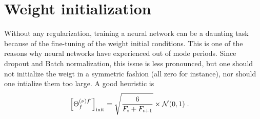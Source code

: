\section{Weight initialization}

Without any regularization, training a neural network can be a daunting task because of the fine-tuning of the weight initial conditions. This is one of the reasons why neural networks have experienced out of mode periods. Since dropout and Batch normalization, this issue is less pronounced, but one should not initialize the weigt in a symmetric fashion (all zero for instance), nor should one intialize them too large. A good heuristic is 
\begin{align}
\left[\Theta^{(\nu)f'}_f\right]_{{\rm init}}&=\sqrt{\frac{6}{F_i+F_{i+1}}}\times\mathcal{N}(0,1)\;.
\end{align}


